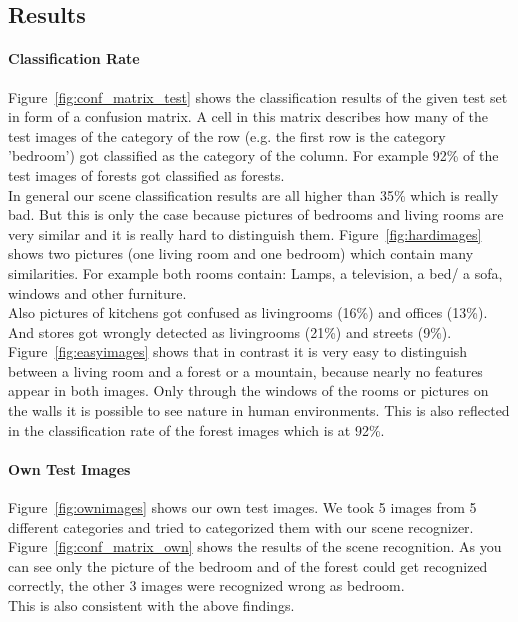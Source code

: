 \documentclass[subfigure,epsfig,fleqn,float,numbers=noenddot]{scrartcl}
\begin{document}
\subsection{Results}
\label{sec:results}

\paragraph{Classification Rate}
\label{sec:classification}
Figure~\ref{fig:conf_matrix_test} shows the classification results of the given test set in form of a confusion matrix. A cell in this matrix describes how many of the test images of the category of the row (e.g. the first row is the category 'bedroom') got classified as the category of the column. For example 92\% of the test images of forests got classified as forests.\\
In general our scene classification results are all higher than 35\% which is really bad. But this is only the case because pictures of bedrooms and living rooms are very similar and it is really hard to distinguish them. Figure~\ref{fig:hardimages} shows two pictures (one living room and one bedroom) which contain many similarities. For example both rooms contain: Lamps, a television, a bed/ a sofa, windows and other furniture.\\
Also pictures of kitchens got confused as livingrooms (16\%) and offices (13\%). And stores got wrongly detected as livingrooms (21\%) and streets (9\%).
Figure~\ref{fig:easyimages} shows that in contrast it is very easy to distinguish between a living room and a forest or a mountain, because nearly no features appear in both images. Only through the windows of the rooms or pictures on the walls it is possible to see nature in human environments. This is also reflected in the classification rate of the forest images which is at 92\%.

\paragraph{Own Test Images}
\label{sec:owntestimages}
Figure~\ref{fig:ownimages} shows our own test images. We took 5 images from 5 different categories and tried to categorized them with our scene recognizer. Figure~\ref{fig:conf_matrix_own} shows the results of the scene recognition. As you can see only the picture of the bedroom and of the forest could get recognized correctly, the other 3 images were recognized wrong as bedroom.\\ This is also consistent with the above findings.
\end{document}
